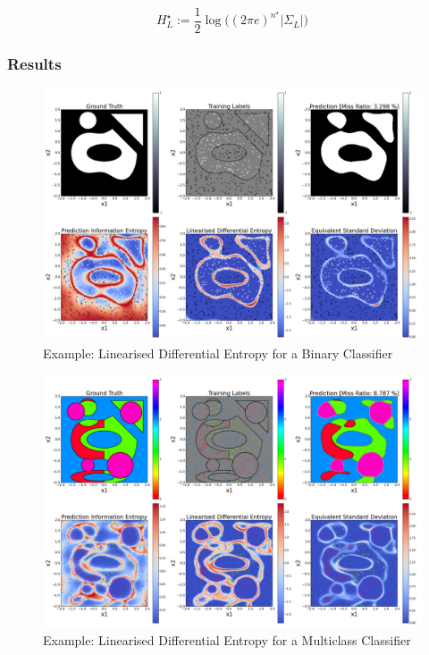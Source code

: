 \documentclass{article}
\begin{document}
			\begin{equation}
				H^{\star}_{L} := \frac{1}{2} \log\Big((2 \pi e)^{n^{\star}} |\Sigma_{L}|\Big)
			\label{Section:LinearisedEntropy:Equation:LinearisedEntropy}
			\end{equation}			
				
		\subsubsection{Results}
		
			\begin{figure}[tb]
			\centering
				\includegraphics[width = \linewidth]{Figures/binary_linearised_entropy/Figure1.png}
			\caption{Example: Linearised Differential Entropy for a Binary Classifier}
			\label{Figure:Results:BinaryLinearisedEntropy}
			\end{figure}

			\begin{figure}[tb]
			\centering
				\includegraphics[width = \linewidth]{Figures/multiclass_linearised_entropy/Figure1.png}
			\caption{Example: Linearised Differential Entropy for a Multiclass Classifier}
			\label{Figure:Results:MulticlassyLinearisedEntropy}
			\end{figure}
					
\end{document}

